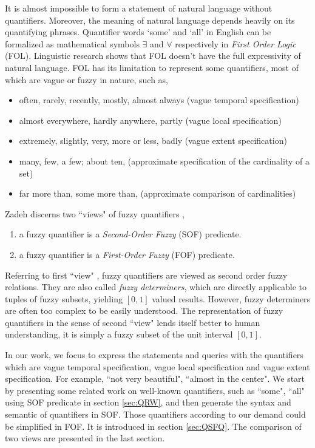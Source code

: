 It is almost impossible to form a statement of natural language without quantifiers. Moreover, the meaning of natural language depends heavily on its quantifying phrases. Quantifier words `some' and `all' in English can be formalized as mathematical symbols $\exists$ and $\forall$ respectively in \textit{First Order Logic} (FOL). Linguistic research shows that FOL doesn't have the full expressivity of natural language. FOL has its limitation to represent some quantifiers, most of which are vague or fuzzy in nature, such as,
\begin{itemize}
\item often, rarely, recently, mostly, almost always (vague temporal specification)
\item almost everywhere, hardly anywhere, partly (vague local specification)
\item extremely, slightly, very, more or less, badly (vague extent specification)
\item many, few, a few; about ten, (approximate specification of the cardinality of a set)
\item far more than, some more than, (approximate comparison of cardinalities)
\end{itemize}

Zadeh discerns two ``views" of fuzzy quantifiers \cite{Z83},
\begin{enumerate}
\item a fuzzy quantifier is a \textit{Second-Order Fuzzy} (SOF) predicate.
\item a fuzzy quantifier is a \textit{First-Order Fuzzy} (FOF) predicate.
\end{enumerate}

Referring to first ``view" , fuzzy quantifiers are viewed as second order fuzzy relations. They are also called \textit{fuzzy determiners}, which are directly applicable to tuples of fuzzy subsets, yielding $[0,1]$ valued results. However, fuzzy determiners are often too complex to be easily understood. The representation of fuzzy quantifiers in the sense of second ``view" lends itself better to human understanding, it is simply a fuzzy subset of the unit interval $[0,1]$.

In our work, we focus to express the statements and queries with the quantifiers which are vague temporal specification, vague local specification and vague extent specification. For example, ``not very beautiful", ``almost in the center". We start by presenting some related work on well-known quantifiers, such as ``some", ``all" using SOF predicate in section \ref{sec:QRW},  and then generate the syntax and semantic of quantifiers in SOF. Those quantifiers according to our demand could be simplified in FOF.  It is introduced in section \ref{sec:QSFQ}. The comparison of two views are presented in the last section.




















